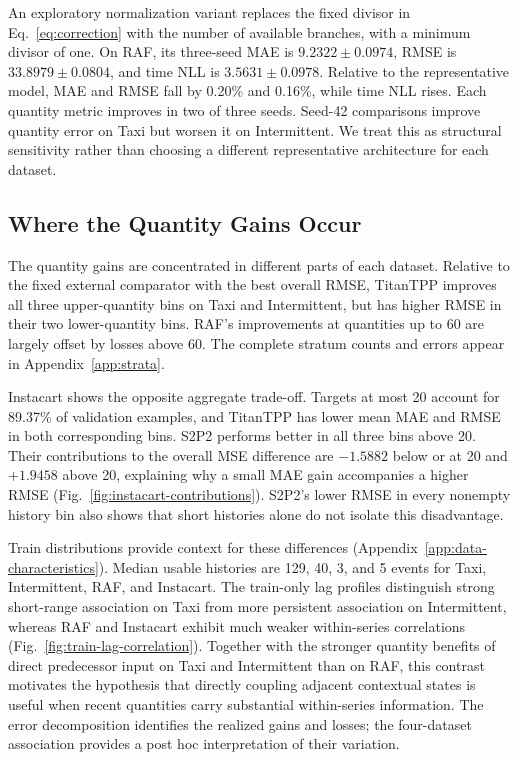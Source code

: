 \documentclass[runningheads]{llncs}
\begin{document}
An exploratory normalization variant replaces the fixed divisor in
Eq.~\eqref{eq:correction} with the number of available branches, with a
minimum divisor of one. On RAF, its three-seed MAE is $9.2322\pm0.0974$,
RMSE is $33.8979\pm0.0804$, and time NLL is $3.5631\pm0.0978$.
Relative to the representative model, MAE and RMSE fall by 0.20\% and
0.16\%, while time NLL rises. Each quantity metric improves in two of three
seeds. Seed-42 comparisons improve quantity error on Taxi but worsen it on
Intermittent. We treat this as structural sensitivity rather than choosing a
different representative architecture for each dataset.

\subsection{Where the Quantity Gains Occur}
The quantity gains are concentrated in different parts of each dataset.
Relative to the fixed external comparator with the best overall RMSE,
TitanTPP improves all three upper-quantity bins on Taxi and Intermittent,
but has higher RMSE in their two lower-quantity bins. RAF's improvements
at quantities up to 60 are largely offset by losses above 60. The complete
stratum counts and errors appear in Appendix~\ref{app:strata}.

Instacart shows the opposite aggregate trade-off. Targets at most 20 account
for 89.37\% of validation examples, and TitanTPP has lower mean MAE and RMSE
in both corresponding bins. S2P2 performs better in all three bins above 20.
Their contributions to the overall MSE difference are $-1.5882$ below or at
20 and $+1.9458$ above 20, explaining why a small MAE gain accompanies a
higher RMSE (Fig.~\ref{fig:instacart-contributions}). S2P2's lower RMSE
in every nonempty history bin also shows that short histories alone do not
isolate this disadvantage.

Train distributions provide context for these differences
(Appendix~\ref{app:data-characteristics}). Median usable histories are
129, 40, 3, and 5 events for Taxi, Intermittent, RAF, and Instacart.
The train-only lag profiles distinguish strong short-range association on
Taxi from more persistent association on Intermittent, whereas RAF and
Instacart exhibit much weaker within-series correlations
(Fig.~\ref{fig:train-lag-correlation}). Together with the stronger quantity
benefits of direct predecessor input on Taxi and Intermittent than on RAF,
this contrast motivates the hypothesis that directly
coupling adjacent contextual states is useful when recent quantities carry
substantial within-series information. The error decomposition identifies
the realized gains and losses; the four-dataset association provides a
post hoc interpretation of their variation.
\end{document}
